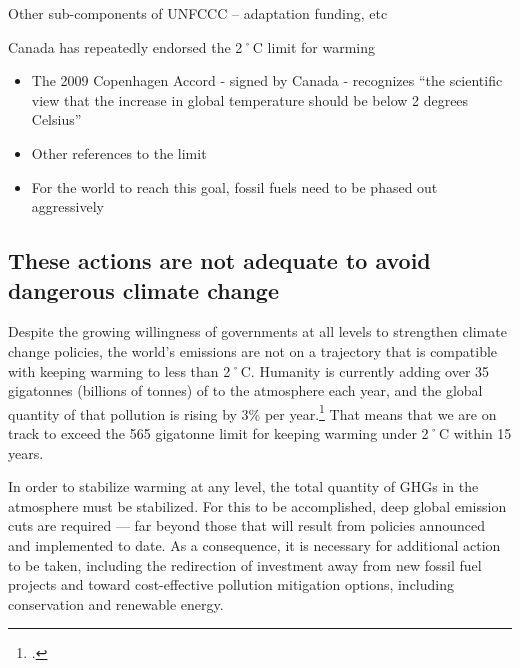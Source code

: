 \begin{vcom}
	Other sub-components of UNFCCC – adaptation funding, etc
\end{vcom}	



Canada has repeatedly endorsed the 2˚C limit for warming
\begin{itemize}
	\item The 2009 Copenhagen Accord - signed by Canada - recognizes ``the scientific view that the increase in global temperature should be below 2 degrees Celsius''
	\item \textsf{Other references to the limit}
	\item For the world to reach this goal, fossil fuels need to be phased out aggressively
\end{itemize}



		\subsection{These actions are not adequate to avoid dangerous climate change}
		
		




Despite the growing willingness of governments at all levels to strengthen climate change policies, the world's emissions are not on a trajectory that is compatible with keeping warming to less than 2˚C.
Humanity is currently adding over 35 gigatonnes (billions of tonnes) of  to the atmosphere each year, and the global quantity of that pollution is rising by 3\% per year.\footcite[][p. 26]{IPCCar4_syr}
That means that we are on track to exceed the 565 gigatonne limit for keeping warming under 2˚C within 15 years.



In order to stabilize warming at any level, the total quantity of GHGs in the atmosphere must be stabilized.
For this to be accomplished, deep global emission cuts are required --- far beyond those that will result from policies announced and implemented to date.
As a consequence, it is necessary for additional action to be taken, including the redirection of investment away from new fossil fuel projects and toward cost-effective pollution mitigation options, including conservation and renewable energy.




